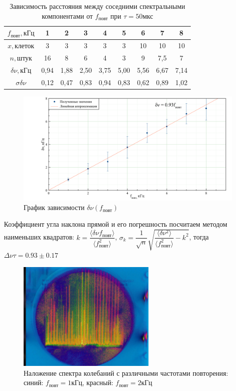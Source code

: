 \documentclass[a4paper, 12pt]{article}
\begin{document}
\begin{table}[H]
\centering
\begin{tabular}{|c|c|c|c|c|c|c|c|c|}
\hline
$f_\text{повт}, \text{кГц}$ & 1    & 2    & 3    & 4    & 5    & 6    & 7    & 8    \\ \hline
$x, \text{клеток}$          & 3    & 3    & 3    & 3    & 3    & 10   & 10   & 10   \\ \hline
$n, \text{штук}$                        & 16   & 8    & 6    & 4    & 3    & 9    & 7,5  & 7    \\ \hline
$\delta \nu, \text{кГц}$    & 0,94 & 1,88 & 2,50 & 3,75 & 5,00 & 5,56 & 6,67 & 7,14 \\ \hline
$\sigma \delta \nu$      & 0,12 & 0,47 & 0,83 & 0,94 & 0,83 & 0,62 & 0,89 & 1,02 \\ \hline
\end{tabular}
\caption{Зависимость расстояния между соседними спектральными компонентами от $f_\text{повт}$ при $\tau = 50 \text{мкс}$ }
\end{table}

\begin{figure}[H]
\centering
\includegraphics[width = \textwidth]{GraphB}
\caption{График зависимости $\delta \nu (f_\text{повт})$}
\end{figure}

Коэффициент угла наклона прямой и его погрешность посчитаем методом наименьших квадратов: $k = \dfrac{\langle \delta \nu f_\text{повт}  \rangle}{\langle f_\text{повт}^2 \rangle}$, $\sigma_k = \dfrac{1}{\sqrt{n}} \sqrt{\dfrac{\langle \delta \nu^2 \rangle}{\langle f_\text{повт}^2 \rangle} - k^2}$, тогда $\Delta \nu \tau = 0.93 \pm 0.17$

\begin{figure}[H]
\centering
\includegraphics[width = 0.6\textwidth]{B}
\caption{Наложение спектра колебаний с различными частотами повторения: синий: $f_\text{повт} = 1 \text{кГц}$, красный: $f_\text{повт} = 2 \text{кГц}$}
\end{figure}
\end{document}
